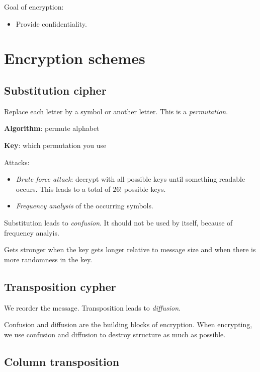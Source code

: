 \documentclass[language=english,number=]{homework}
\author{Sophie van den Eerenbeemt\\0954445}
\date{\today}
\begin{document}
    \maketitlepage

    Goal of encryption:
    \begin{itemize}
        \item Provide confidentiality.
    \end{itemize}

    \section{Encryption schemes}

    \subsection{Substitution cipher}

    Replace each letter by a symbol or another letter.
    This is a \textit{permutation}.

    \textbf{Algorithm}: permute alphabet

    \textbf{Key}: which permutation you use

    Attacks:
    \begin{itemize}
        \item \textit{Brute force attack}: decrypt with all possible keys until something readable occurs.
        This leads to a total of $26!$ possible keys.
        \item \textit{Frequency analysis} of the occurring symbols.
    \end{itemize}

    Substitution leads to \textit{confusion}.
    It should not be used by itself, because of frequency analyis.

    Gets stronger when the key gets longer relative to message size and when there is more randomness in the key.

    \subsection{Transposition cypher}

    We reorder the message.
    Transposition leads to \textit{diffusion}.

    Confusion and diffusion are the building blocks of encryption.
    When encrypting, we use confusion and diffusion to destroy structure as much as possible.

    \subsection{Column transposition}
\end{document}
